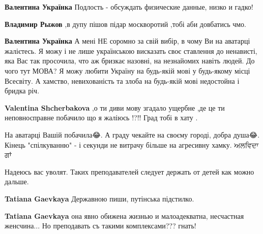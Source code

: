 \begin{itemize}
\begin{itemize}
\textbf{Валентина Українка} Подлость - обсуждать физические данные, низко и гадко!


\textbf{Владимир Рыжов} ,в дупу пішов підар москворотий ,тобі аби довбатись чмо.


\textbf{Валентина Українка} А мені НЕ соромно за свій вибір, в чому Ви на аватарці жалієтесь. Я можу і не лише українською висказать своє ставлення до ненависті, яка Вас так просочила, что аж бризкає назовні, на незнайомих навіть людей. До чого тут МОВА? Я можу любити Україну на будь-якій мові у будь-якому місці Всесвіту. А хамство, невихованість та злоба на будь-якій мові недостойна і бридка річ.


\textbf{Valentina Shcherbakova} ,о ти диви мову згадало ущербне ,де це ти неповносправне побачило що я жаліюсь !?!! Град тобі в хату .


На аватарці Вашій побачила😂. А граду чекайте на своєму городі, добра душа😂.
Кінець "спілкуванню" - і секунди не витрачу більше на агресивну хамку. ਅਲਵਿਦਾ ਗਾਂ

\end{itemize}



Надеюсь вас уволят. Таких преподавателей следует держать от детей как можно дальше.

\begin{itemize}

\textbf{Tatiana Gaevkaya} Державною пиши, путінська підстилко.


\textbf{Tatiana Gaevkaya} она явно обижена жизнью и малоадекватна, несчастная
женсчина... Но преподавать съ такими комплексами??? гнать!
\end{itemize}


\end{itemize}
